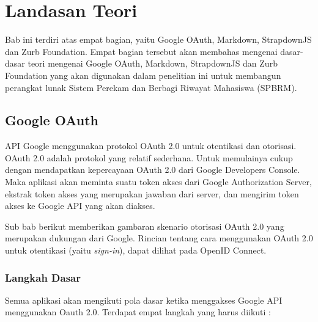 \chapter{Landasan Teori}
\label{chap:landasanteori}

Bab ini terdiri atas empat bagian, yaitu Google OAuth, Markdown, StrapdownJS dan Zurb Foundation. Empat bagian tersebut akan membahas mengenai dasar-dasar teori mengenai Google OAuth, Markdown, StrapdownJS dan Zurb Foundation yang akan digunakan dalam penelitian ini untuk membangun perangkat lunak Sistem Perekam dan Berbagi Riwayat Mahasiswa (SPBRM).

\section{Google OAuth \cite{Oauth:2013}}
\label{sec:googleauthentication}

API Google menggunakan protokol OAuth 2.0 untuk otentikasi dan otorisasi. OAuth 2.0 adalah protokol yang relatif sederhana. Untuk memulainya cukup dengan mendapatkan kepercayaan OAuth 2.0 dari Google Developers Console\footnotemark[1]. Maka aplikasi akan meminta suatu token akses dari Google Authorization Server, ekstrak token akses yang merupakan jawaban dari server, dan mengirim token akses ke Google API yang akan diakses.


Sub bab berikut memberikan gambaran skenario otorisasi OAuth 2.0 yang merupakan dukungan dari Google. Rincian tentang cara menggunakan OAuth 2.0 untuk otentikasi (yaitu {\it sign-in}), dapat dilihat pada OpenID Connect\footnotemark[2].

\subsection{Langkah Dasar}
Semua aplikasi akan mengikuti pola dasar ketika menggakses Google API menggunakan Oauth 2.0. Terdapat empat langkah yang harus diikuti :

